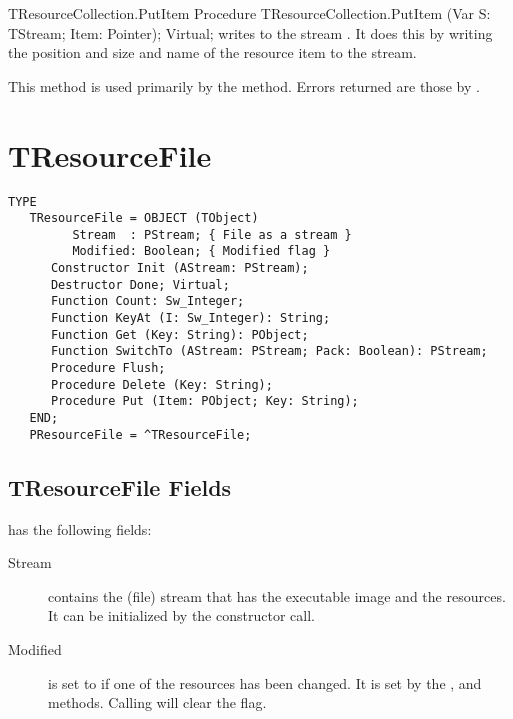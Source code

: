 \begin{procedure}{TResourceCollection.PutItem}
\Declaration
Procedure TResourceCollection.PutItem (Var S: TStream; Item: Pointer); Virtual;
\Description
{} writes  to the stream . It does this by
writing the position and size and name of the resource item to the stream.

This method is used primarily by the 
method.
\Errors
Errors returned are those by .
\SeeAlso
{}
\end{procedure}


\section{TResourceFile}
\label{se:TResourceFile}

\begin{verbatim}
TYPE
   TResourceFile = OBJECT (TObject)
         Stream  : PStream; { File as a stream }
         Modified: Boolean; { Modified flag }
      Constructor Init (AStream: PStream);
      Destructor Done; Virtual;
      Function Count: Sw_Integer;
      Function KeyAt (I: Sw_Integer): String;
      Function Get (Key: String): PObject;
      Function SwitchTo (AStream: PStream; Pack: Boolean): PStream;
      Procedure Flush;
      Procedure Delete (Key: String);
      Procedure Put (Item: PObject; Key: String);
   END;
   PResourceFile = ^TResourceFile;
\end{verbatim}

\subsection{TResourceFile Fields}

 has the following fields:
\begin{description}
\item[Stream] contains the (file) stream that has the executable image and
the resources. It can be initialized by the 
constructor call.
\item[Modified] is set to  if one of the resources has been changed.
It is set by the ,
 and 
methods. Calling  will clear the
 flag.
\end{description}

